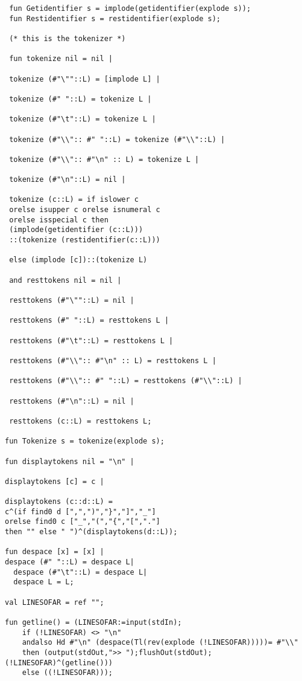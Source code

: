 \documentclass[12pt]{article}
\begin{document}
\begin{verbatim}
 fun Getidentifier s = implode(getidentifier(explode s));
 fun Restidentifier s = restidentifier(explode s);
 
 (* this is the tokenizer *)
 
 fun tokenize nil = nil |
 
 tokenize (#"\""::L) = [implode L] |
 
 tokenize (#" "::L) = tokenize L |
 
 tokenize (#"\t"::L) = tokenize L |
 
 tokenize (#"\\":: #" "::L) = tokenize (#"\\"::L) |
 
 tokenize (#"\\":: #"\n" :: L) = tokenize L |
 
 tokenize (#"\n"::L) = nil |
 
 tokenize (c::L) = if islower c 
 orelse isupper c orelse isnumeral c 
 orelse isspecial c then 
 (implode(getidentifier (c::L)))
 ::(tokenize (restidentifier(c::L)))
 
 else (implode [c])::(tokenize L)
 
 and resttokens nil = nil |
 
 resttokens (#"\""::L) = nil |
 
 resttokens (#" "::L) = resttokens L |
 
 resttokens (#"\t"::L) = resttokens L |
 
 resttokens (#"\\":: #"\n" :: L) = resttokens L |
 
 resttokens (#"\\":: #" "::L) = resttokens (#"\\"::L) |
 
 resttokens (#"\n"::L) = nil |
 
 resttokens (c::L) = resttokens L;
 
fun Tokenize s = tokenize(explode s); 

fun displaytokens nil = "\n" |

displaytokens [c] = c |

displaytokens (c::d::L) = 
c^(if find0 d [",",")","}","]","_"] 
orelse find0 c ["_","(","{","[","."] 
then "" else " ")^(displaytokens(d::L));

fun despace [x] = [x] |
despace (#" "::L) = despace L|
  despace (#"\t"::L) = despace L|
  despace L = L;
  
val LINESOFAR = ref "";

fun getline() = (LINESOFAR:=input(stdIn);
    if (!LINESOFAR) <> "\n"
	andalso Hd #"\n" (despace(Tl(rev(explode (!LINESOFAR)))))= #"\\"
	then (output(stdOut,">> ");flushOut(stdOut);(!LINESOFAR)^(getline()))
	else ((!LINESOFAR)));
	

\end{verbatim}
\end{document}
